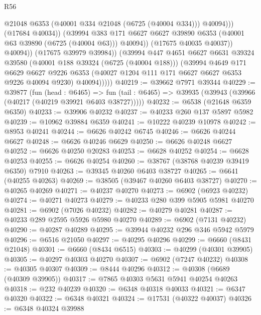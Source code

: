 \begin{lexlean}{R56}
\begin{coremodule}
                            @21048
                            @6353
                            (@40001 @334 @21048 (@6725 (@40004 @334)))
                            @40094)))
                      (@17684 @40034))
                    (@39994
                      @383
                      @171
                      @6627
                      @6627
                      @39890
                      @6353
                      (@40001 @63 @39890 (@6725 (@40004 @63)))
                      @40094))
                  (@17675 @40035 @40037))
                @40094))
            (@17675 @39979 @39984))
          (@39994
            @447
            @4651
            @6627
            @6631
            @39324
            @39580
            (@40001 @188 @39324 (@6725 (@40004 @188)))
            (@39994
              @4649
              @171
              @6629
              @6627
              @9226
              @6353
              (@40027 @1204 @111 @171 @6627 @6627 @6353 @9226 @40094 @9230)
              @40094)))))
@40219 := @39662 @7971 @39344
@40229 := @39877
    (fun (head : @6465) =>
    fun (tail : @6465) => @39935 (@39943 (@39966 (@40217 (@40219 @39921 @6403 @38727)))))
@40232 := @6538 (@21648 @6359 @6350)
@40233 := @39906 @40232
@40237 := @40233 @260 @137 @5897 @5982
@40239 := @10962 @39884 @6359
@40241 := @10222 @40239 @10978
@40242 := @8953 @40241
@40244 := @6626 @40242 @6745
@40246 := @6626 @40244 @6627
@40248 := @6626 @40246 @6629
@40250 := @6626 @40248 @6627
@40252 := @6626 @40250 @20283
@40253 := @6628 @40252
@40254 := @6628 @40253
@40255 := @6626 @40254
@40260 := @38767 (@38768 @40239 @39419 @6350) @7910
@40263 := @39345 @40260 @6403 @38727
@40265 := @6641 (@40255 @40263)
@40269 := @38505 (@39467 @40260 @6403 @38727)
@40270 := @40265 @40269
@40271 := @40237 @40270
@40273 := @6902 (@6923 @40232)
@40274 := @40271 @40273
@40279 := @40233 @280 @399 @5905 @5981 @40270
@40281 := @6902 (@7026 @40232)
@40282 := @40279 @40281
@40287 := @40233 @289 @2595 @5926 @5980 @40270
@40289 := @6902 (@7131 @40232)
@40290 := @40287 @40289
@40295 := @39944 @40232 @296 @346 @5942 @5979
@40296 := @6516 @21050
@40297 := @40295 @40296
@40299 := @6660 (@8431 @21048)
@40301 := @6660 (@8434 @6515)
@40303 := @40299 (@40301 @39905)
@40305 := @40297 @40303 @40270
@40307 := @6902 (@7247 @40232)
@40308 := @40305 @40307
@40309 := @8444 @40296
@40312 := @40308 (@6689 (@40309 @39905))
@40317 := @7865 @40303 @5631 @5941 @40254 @40263
@40318 := @232 @40239
@40320 := @6348 @40318 @40033
@40321 := @6347 @40320
@40322 := @6348 @40321
@40324 := @17531 (@40322 @40037)
@40326 := @6348 @40324 @39988

\end{coremodule}
\end{lexlean}
